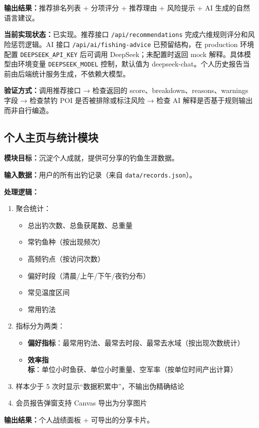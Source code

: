 \textbf{输出结果：}推荐排名列表 + 分项评分 + 推荐理由 + 风险提示 + AI 生成的自然语言建议。

\textbf{当前实现状态：}已实现。推荐接口 \texttt{/api/recommendations} 完成六维规则评分和风险惩罚逻辑。AI 接口 \texttt{/api/ai/fishing-advice} 已预留结构，在 production 环境配置 \texttt{DEEPSEEK\_API\_KEY} 后可调用 DeepSeek；未配置时返回 mock 解释。具体模型由环境变量 \texttt{DEEPSEEK\_MODEL} 控制，默认值为 deepseek-chat。个人历史报告当前由后端统计服务生成，不依赖大模型。

\textbf{验证方式：}调用推荐接口 → 检查返回的 score、breakdown、reasons、warnings 字段 → 检查禁钓 POI 是否被排除或标注风险 → 检查 AI 解释是否基于规则输出而非自行编造。

\subsection{个人主页与统计模块}

\textbf{模块目标：}沉淀个人成就，提供可分享的钓鱼生涯数据。

\textbf{输入数据：}用户的所有出钓记录（来自 \texttt{data/records.json}）。

\textbf{处理逻辑：}
\begin{enumerate}
  \item 聚合统计：
  \begin{itemize}
    \item 总出钓次数、总鱼获尾数、总重量
    \item 常钓鱼种（按出现频次）
    \item 高频钓点（按访问次数）
    \item 偏好时段（清晨/上午/下午/夜钓分布）
    \item 常见温度区间
    \item 常用钓法
  \end{itemize}
  \item 指标分为两类：
  \begin{itemize}
    \item \textbf{偏好指标}：最常用钓法、最常去时段、最常去水域（按出现次数统计）
    \item \textbf{效率指标}：单位小时鱼获、单位小时重量、空军率（按单位时间产出计算）
  \end{itemize}
  \item 样本少于 5 次时显示“数据积累中”，不输出伪精确结论
  \item 会员报告弹窗支持 Canvas 导出为分享图片
\end{enumerate}

\textbf{输出结果：}个人战绩面板 + 可导出的分享卡片。

